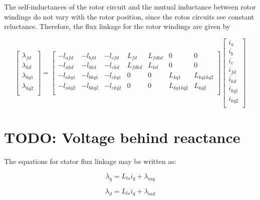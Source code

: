 The self-inductances of the rotor circuit and the mutual inductance between rotor windings do not vary with the rotor position, since the rotos circuits see constant reluctance. Therefore, the flux linkage for the rotor windings are given by

\begin{equation} \label{eq:FluxRotor}
	\begin{bmatrix}
		\lambda_{fd} \\
		\lambda_{kd} \\		
		\lambda_{kq1} \\
		\lambda_{kq2} \\

	\end{bmatrix}
	=
	\begin{bmatrix}
		-l_{afd} & -l_{bfd} & -l_{cfd} & L_{fd} & L_{fdkd} & 0 & 0 \\
		-l_{akd} & -l_{bkd} & -l_{ckd} & L_{fdkd} & L_{kd} & 0 & 0  \\  	
		-l_{akq1} & -l_{bkq1} & -l_{ckq1} & 0 & 0 & L_{kq1} & L_{kq1kq2} \\  
		-l_{akq2} & -l_{bkq2} & -l_{ckq2} & 0 & 0 & L_{kq1kq2} & L_{kq2} \\
		
	\end{bmatrix}
	\begin{bmatrix}
		i_a \\
		i_b \\
		i_c \\
		i_{fd} \\
		i_{kd} \\
		i_{kq1} \\
		i_{kq2} \\
	\end{bmatrix}
\end{equation}


\section{TODO: Voltage behind reactance}

The equations for stator flux linkage may be written as:

\begin{equation}
\lambda_{q} = L_{ls} i_q + \lambda_{mq}
\end{equation}

\begin{equation}
\lambda_{d} = L_{ls} i_q + \lambda_{md}
\end{equation}

